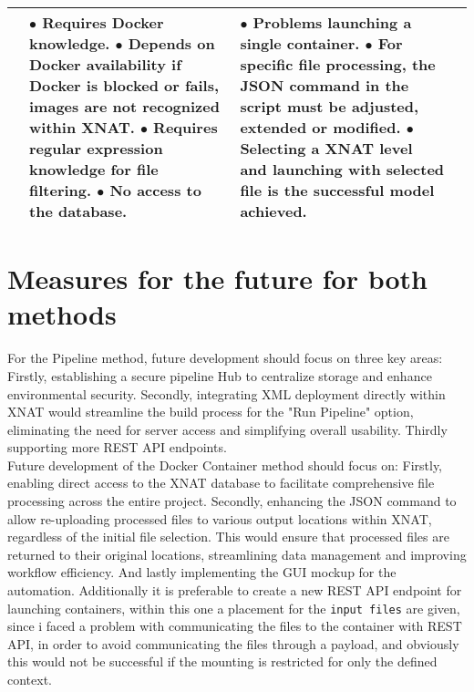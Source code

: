 \begin{table}[htbp]
\begin{tabular}{|p{1cm}|p{3cm}|p{5cm}|p{4cm}|}
{}
&
\parbox[t]{6cm}{
$\bullet$ Requires Docker knowledge. \\
$\bullet$ Depends on Docker availability \\if Docker is blocked or fails, \\images are not recognized\\ within XNAT. \\
$\bullet$ Requires regular expression\\ knowledge for file filtering. \\
$\bullet$ No access to the database. \\

}
&
\parbox[t]{4cm}{
$\bullet$ Problems launching a single container. \\
$\bullet$ For specific file processing, the JSON command in the script must be adjusted, extended or modified.\\
$\bullet$ Selecting a XNAT level and launching with selected file is the successful model achieved. 
} \\
\hline
\end{tabular}
\label{tab:docker_pipeline}
\end{table}


\section{Measures for the future for both methods}

For the Pipeline method, future development should focus on three key areas: Firstly, establishing a secure pipeline Hub to centralize storage and enhance environmental security. Secondly, integrating XML deployment directly within XNAT would streamline the build process for the "Run Pipeline" option, eliminating the need for server access and simplifying overall usability. Thirdly supporting more REST API endpoints.\\
Future development of the Docker Container method should focus on: Firstly, enabling direct access to the XNAT database to facilitate comprehensive file processing across the entire project. Secondly, enhancing the JSON command to allow re-uploading processed files to various output locations within XNAT, regardless of the initial file selection. This would ensure that processed files are returned to their original locations, streamlining data management and improving workflow efficiency. And lastly implementing the GUI mockup for the automation.
Additionally it is preferable to create a new REST API endpoint for launching containers, within this one a placement for the \texttt{input files} are given, since i faced a problem with communicating the files to the container with REST API, in order to avoid communicating the files through a payload, and obviously this would not be successful if the mounting is restricted for only the defined context. 

